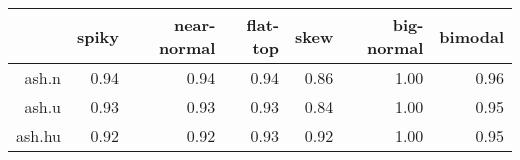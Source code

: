 \begin{tabular}{rrrrrrr}
  \toprule  & spiky & near-normal & flat-top & skew & big-normal & bimodal \\ 
  \midrule ash.n & 0.94 & 0.94 & 0.94 & 0.86 & 1.00 & 0.96 \\ 
  ash.u & 0.93 & 0.93 & 0.93 & 0.84 & 1.00 & 0.95 \\ 
  ash.hu & 0.92 & 0.92 & 0.93 & 0.92 & 1.00 & 0.95 \\ 
   \bottomrule \end{tabular}

